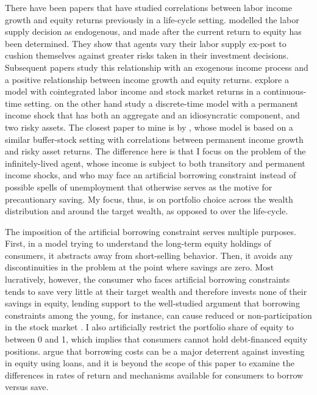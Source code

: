 There have been papers that have studied correlations between labor income growth and equity returns previously in a life-cycle setting. \citet{Bodie1992} modelled the labor supply decision as endogenous, and made after the current return to equity has been determined. They show that agents vary their labor supply ex-post to cushion themselves against greater risks taken in their investment decisions. Subsequent papers study this relationship with an exogenous income process and a positive relationship between income growth and equity returns. \citet{Benzoni2007} explore a model with cointegrated labor income and stock market returns in a continuous-time setting. \citet{Bagliano2014} on the other hand study a discrete-time model with a permanent income shock that has both an aggregate and an idiosyncratic component, and two risky assets. The closest paper to mine is by \citet{Viceira2001}, whose model is based on a similar buffer-stock setting with correlations between permanent income growth and risky asset returns. The difference here is that I focus on the problem of the infinitely-lived agent, whose income is subject to both transitory and permanent income shocks, and who may face an artificial borrowing constraint instead of possible spells of unemployment that otherwise serves as the motive for precautionary saving. My focus, thus, is on portfolio choice across the wealth distribution and around the target wealth, as opposed to over the life-cycle.

The imposition of the artificial borrowing constraint serves multiple purposes. First, in a model trying to understand the long-term equity holdings of consumers, it abstracts away from short-selling behavior. Then, it avoids any discontinuities in the problem at the point where savings are zero. Most lucratively, however, the consumer who faces artificial borrowing constraints tends to save very little at their target wealth and therefore invests none of their savings in equity, lending support to the well-studied argument that borrowing constraints among the young, for instance, can cause reduced or non-participation in the stock market \citep{Constantinides2002, Haliassos1998, Kogan2007, Jang2015, Harenberg2018}. I also artificially restrict the portfolio share of equity to between 0 and 1, which implies that consumers cannot hold debt-financed equity positions. \citet{Davis2006} argue that borrowing costs can be a major deterrent against investing in equity using loans, and it is beyond the scope of this paper to examine the differences in rates of return and mechanisms available for consumers to borrow versus save.


